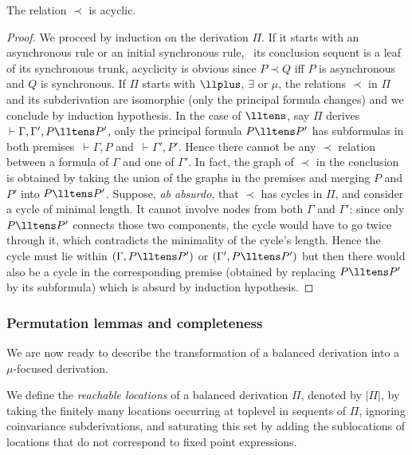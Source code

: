 \begin{lemma}\label{lem:mini}
The relation $\prec$ is acyclic.
\end{lemma}

\begin{proof}
We proceed by induction on the derivation $\Pi$.
If it starts with an asynchronous rule or an initial synchronous rule,
\ie\ its conclusion sequent is a leaf of its synchronous trunk,
acyclicity is obvious since $P\prec Q$ iff $P$ is asynchronous
and $Q$ is synchronous.
If $\Pi$ starts with $\llplus$, $\exists$ or $\mu$,
the relations $\prec$ in $\Pi$ and its subderivation
are isomorphic (only the principal formula changes)
and we conclude by induction hypothesis.
In the case of $\lltens$,
say $\Pi$ derives $\,\vdash\Gamma,\Gamma',P\lltens P'$,
only the principal formula $P\lltens P'$ has subformulas in both premises
$\,\vdash\Gamma,P$ and $\,\vdash\Gamma',P'$.
Hence there cannot be any $\prec$ relation between a formula of $\Gamma$
and one of $\Gamma'$.
In fact, the graph of $\prec$ in the conclusion is obtained by taking
the union of the graphs in the premises
and merging $P$ and $P'$ into $P\lltens P'$.
Suppose, \emph{ab absurdo}, that $\prec$ has cycles in $\Pi$,
and consider a cycle of minimal length.
It cannot involve nodes from both $\Gamma$ and $\Gamma'$:
since only $P\lltens P'$ connects those two components,
the cycle would have to go twice through it,
which contradicts the minimality of the cycle's length.
Hence the cycle must lie within
$(\Gamma,P\lltens P')$ or $(\Gamma',P\lltens P')$
but then there would also be a cycle in the corresponding premise
(obtained by replacing $P\lltens P'$ by its subformula)
which is absurd by induction hypothesis.
\end{proof}

\subsubsection{Permutation lemmas and completeness} 

We are now ready to describe the transformation of a balanced derivation
into a $\mu$-focused derivation.

\begin{definition}
We define the \emph{reachable locations} of a balanced
derivation $\Pi$, denoted by $|\Pi|$, by taking
the finitely many locations occurring at toplevel in sequents of $\Pi$,
ignoring coinvariance subderivations,
and saturating this set by adding the sublocations of
locations that do not correspond to fixed point expressions.
\end{definition}

